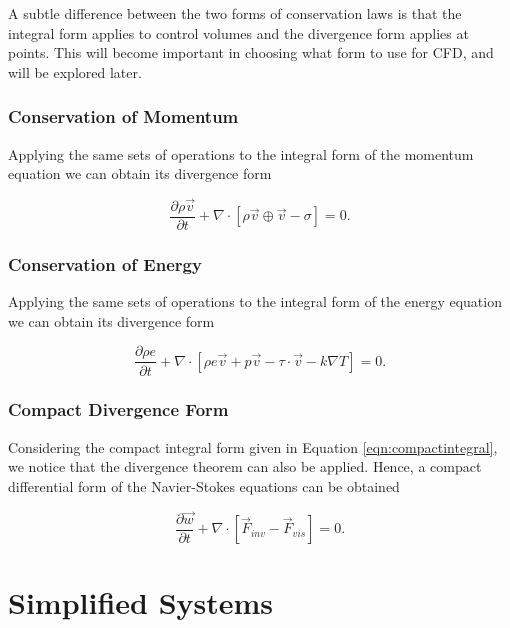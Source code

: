 \begin{remark}
A subtle difference between the two forms of conservation laws is that the integral form applies to control volumes and the divergence form applies at points. This will become important in choosing what form to use for CFD, and will be explored later.
\end{remark}

\subsection{Conservation of Momentum}
Applying the same sets of operations to the integral form of the momentum equation we can obtain its divergence form
\begin{eqBox}
\begin{equation}
	 \frac{\partial \rho \vec{v}}{\partial t} + \nabla \cdot \left[ \rho \vec{v} \oplus \vec{v} - \sigma \right] =  0.
\end{equation}
\end{eqBox}

\subsection{Conservation of Energy}
Applying the same sets of operations to the integral form of the energy equation we can obtain its divergence form
\begin{eqBox}
\begin{equation}
\frac{\partial \rho e}{\partial t} + \nabla \cdot \left[ \rho e \vec{v} + p\vec{v} - \tau \cdot \vec{v} - k \nabla T \right] = 0.
\end{equation}
\end{eqBox}

\subsection{Compact Divergence Form}
Considering the compact integral form given in Equation \ref{eqn:compactintegral}, we notice that the divergence theorem can also be applied. Hence, a compact differential form of the Navier-Stokes equations can be obtained
\begin{eqBox}
\begin{equation}
\frac{\partial \vec{w}}{\partial t} + \nabla \cdot \left[\vec{F}_{inv} - \vec{F}_{vis}\right] = 0.
\end{equation}
\end{eqBox}

\chapter{Simplified Systems}


